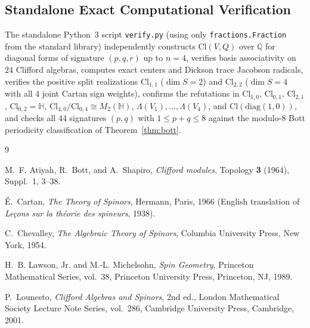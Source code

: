 \documentclass[11pt,a4paper]{article}
\theoremstyle{plain}
\theoremstyle{definition}
\theoremstyle{remark}
\newcommand{\Cl}{\mathrm{Cl}}
\begin{document}
\subsection{Standalone Exact Computational Verification}
The standalone Python~3 script \texttt{verify.py} (using only \texttt{fractions.Fraction} from the standard library) independently constructs $\Cl(V, Q)$ over $\mathbb{Q}$ for diagonal forms of signature $(p, q, r)$ up to $n = 4$, verifies basis associativity on $24$ Clifford algebras, computes exact centers and Dickson trace Jacobson radicals, verifies the positive split realizations $\Cl_{1,1}$ ($\dim S = 2$) and $\Cl_{2,2}$ ($\dim S = 4$ with all $4$ joint Cartan sign weights), confirms the refutations in $\Cl_{1,0}$, $\Cl_{0,1}$, $\Cl_{2,1}$, $\Cl_{0,2} = \mathbb{H}$, $\Cl_{4,0}/\Cl_{0,4} \cong M_2(\mathbb{H})$, $\Lambda(V_1),\dots,\Lambda(V_4)$, and $\Cl(\mathrm{diag}(1,0))$, and checks all $44$ signatures $(p, q)$ with $1 \le p + q \le 8$ against the modulo-$8$ Bott periodicity classification of Theorem~\ref{thm:bott}.

\begin{thebibliography}{9}

M.~F. Atiyah, R.~Bott, and A.~Shapiro,
\emph{Clifford modules},
Topology \textbf{3} (1964), Suppl.~1, 3--38.

\'E.~Cartan,
\emph{The Theory of Spinors},
Hermann, Paris, 1966 (English translation of \emph{Le\c{c}ons sur la th\'eorie des spineurs}, 1938).

C.~Chevalley,
\emph{The Algebraic Theory of Spinors},
Columbia University Press, New York, 1954.

H.~B. Lawson, Jr. and M.-L. Michelsohn,
\emph{Spin Geometry},
Princeton Mathematical Series, vol.~38, Princeton University Press, Princeton, NJ, 1989.

P.~Lounesto,
\emph{Clifford Algebras and Spinors}, 2nd ed.,
London Mathematical Society Lecture Note Series, vol.~286, Cambridge University Press, Cambridge, 2001.

\end{thebibliography}
\end{document}
